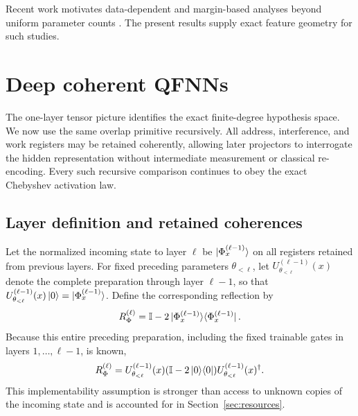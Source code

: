 \documentclass[pdflatex,sn-mathphys,NameDate,iicol]{sn-jnl}
\newcommand{\id}{\mathbb{I}}
\newcommand{\proj}[1]{\ket{#1}\!\bra{#1}}
\begin{document}
Recent work motivates data-dependent and margin-based analyses beyond uniform
parameter counts \citep{gilfuster2024rethinking,hur2025margins}. The present
results supply exact feature geometry for such studies.

\section{Deep coherent QFNNs}
\label{sec:deep}

The one-layer tensor picture identifies the exact finite-degree hypothesis
space. We now use the same overlap primitive recursively. All address,
interference, and work registers may be retained coherently, allowing later
projectors to interrogate the hidden representation without intermediate
measurement or classical re-encoding. Every such recursive comparison
continues to obey the exact Chebyshev activation law.

\subsection{Layer definition and retained coherences}

Let the normalized incoming state to layer $\ell$ be
$\ket{\Phi_x^{(\ell-1)}}$ on all registers retained from previous layers.
For fixed preceding parameters $\theta_{<\ell}$, let
$U_{\theta_{<\ell}}^{(\ell-1)}(x)$ denote the complete preparation through
layer $\ell-1$, so that
$U_{\theta_{<\ell}}^{(\ell-1)}(x)\ket0
=\ket{\Phi_x^{(\ell-1)}}$. Define the corresponding reflection by
\begin{equation}
  R_{\Phi}^{(\ell)}
  =\id-2\proj{\Phi_x^{(\ell-1)}}.
  \label{eq:current-reflection}
\end{equation}
Because this entire preceding preparation, including the fixed trainable
gates in layers $1,\ldots,\ell-1$, is known,
\begin{equation}
  R_{\Phi}^{(\ell)}
  =U_{\theta_{<\ell}}^{(\ell-1)}(x)
   (\id-2\proj0)
   U_{\theta_{<\ell}}^{(\ell-1)}(x)^{\dagger}.
  \label{eq:current-reflection-implementation}
\end{equation}
This implementability assumption is stronger than access to unknown copies
of the incoming state and is accounted for in Section~\ref{sec:resources}.
\end{document}
